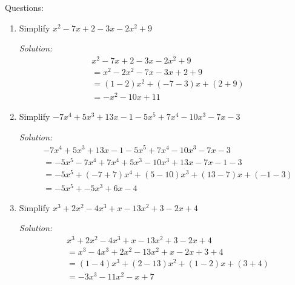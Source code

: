 \documentclass[16pt]{article}
\theoremstyle{remark}
\begin{document}
Questions:
\begin{enumerate}
\item Simplify $\displaystyle{x^2-7x+2 - 3x-2x^2+9}$
\begin{mdframed}[style=TheoremFrame]
\textit{Solution:}
\begin{align*}
&x^2-7x+2 - 3x-2x^2+9\\
&= x^2 - 2x^2 - 7x - 3x + 2 + 9\\
&= (1-2)x^2 + (-7-3)x + (2+9)\\
&= -x^2-10x+11
\end{align*}
\end{mdframed}
\newpage

\item Simplify $\displaystyle{-7x^4+5x^3+13x-1 - 5x^5 +7x^4 - 10x^3 -7x-3}$
\begin{mdframed}[style=TheoremFrame]
\textit{Solution:}
\begin{align*}
&-7x^4+5x^3+13x-1 - 5x^5 +7x^4 - 10x^3 -7x-3\\
&= -5x^5 - 7x^4+7x^4+5x^3-10x^3+13x-7x-1-3\\
&= -5x^5 +(-7+7)x^4 + (5-10)x^3+(13-7)x+(-1-3)\\
&= -5x^5 + -5x^3+6x-4
\end{align*}
\end{mdframed}

\item Simplify $\displaystyle{x^3+2x^2-4x^3+x-13x^2+3-2x+4}$
\begin{mdframed}[style=TheoremFrame]
\textit{Solution:}
\begin{align*}
&x^3+2x^2-4x^3+x-13x^2+3-2x+4\\
&= x^3-4x^3+2x^2-13x^2+x-2x+3+4\\
&= (1-4)x^3+(2-13)x^2+(1-2)x+(3+4)\\
&= -3x^3-11x^2-x+7
\end{align*}
\end{mdframed}


\end{enumerate}
\end{document}
